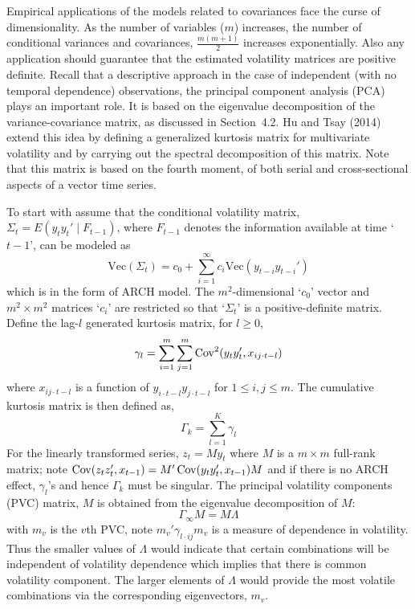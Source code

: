 Empirical applications of the models related to covariances face the curse of dimensionality. As the number of variables ($m$) increases, the number of conditional variances and covariances, $\frac{m(m+1)}{2}$ increases exponentially. Also any application should guarantee that the estimated volatility matrices are positive definite. Recall that a descriptive approach in the case of independent (with no temporal dependence) observations, the principal component analysis (PCA) plays an important role. It is based on the eigenvalue decomposition of the variance-covariance matrix, as discussed in Section~4.2. Hu and Tsay (2014)~\cite{hutsay14} extend this idea by defining a generalized kurtosis matrix for multivariate volatility and by carrying out the spectral decomposition of this matrix. Note that this matrix is based on the fourth moment, of both serial and cross-sectional aspects of a vector time series.


To start with assume that the conditional volatility matrix, $\Sigma_t=E(y_ty_t' \;|\; F_{t-1})$, where $F_{t-1}$ denotes the information available at time `$t-1$', can be modeled as
	\begin{equation}\label{eqn:vtmodel}
	\text{Vec}(\Sigma_t)= c_0 + \sum_{i=1}^\infty c_i \text{Vec}(y_{t-i} y_{t-i}')
	\end{equation}
which is in the form of ARCH model. The $m^2$-dimensional `$c_0$' vector and $m^2 \times m^2$ matrices `$c_i$' are restricted so that `$\Sigma_t$' is a positive-definite matrix. Define the lag-$l$ generated kurtosis matrix, for $l \geq 0$,
	\begin{equation}\label{eqn:kurtosismat}
	\gamma_l = \sum_{i=1}^m \sum_{j=1}^m \Cov^2(y_t y_t', x_{ij \cdot t - l} )
	\end{equation}
where $x_{ij \cdot t - l}$ is a function of $y_{i \cdot t-l} y_{j \cdot t-l}$ for $1 \leq i,j \leq m$. The cumulative kurtosis matrix is then defined as,
	\begin{equation}\label{eqn:cumkurt}
	\Gamma_k=\sum_{l=1}^K \gamma_l
	\end{equation}
For the linearly transformed series, $z_t=My_t$ where $M$ is a $m \times m$ full-rank matrix; note $\operatorname{Cov}(z_tz_t', x_{t-1})=M' \operatorname{Cov}(y_ty_t', x_{t-1})M$ and if there is no ARCH effect, $\gamma_l$'s and hence $\Gamma_k$ must be singular. The principal volatility components (PVC) matrix, $M$ is obtained from the eigenvalue decomposition of $M$:
	\begin{equation}\label{eqn:obtainM}
	\Gamma_\infty M= M \Lambda
	\end{equation}
with $m_v$ is the $v$th PVC, note $m_v'\gamma_{l \cdot ij} m_v$ is a measure of dependence in volatility. Thus the smaller values of $\Lambda$ would indicate that certain combinations will be independent of volatility dependence which implies that there is common volatility component. The larger elements of $\Lambda$ would provide the most volatile combinations via the corresponding eigenvectors, $m_v$. 



